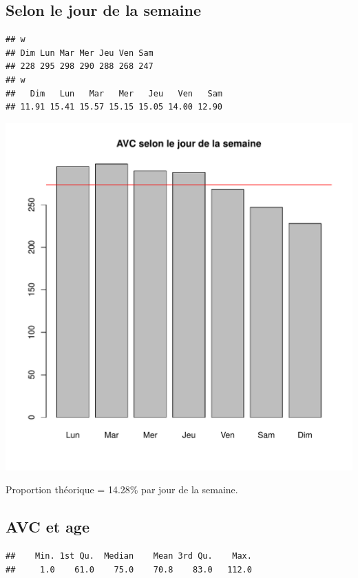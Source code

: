 \documentclass[12pt,english,french,twoside]{report}\usepackage[]{graphicx}\usepackage[]{color}
\makeatletter
\def\maxwidth{ %
  \ifdim\Gin@nat@width>\linewidth
    \linewidth
  \else
    \Gin@nat@width
  \fi
}
\newenvironment{kframe}{%
 \def\at@end@of@kframe{}%
 \ifinner\ifhmode%
  \def\at@end@of@kframe{\end{minipage}}%
  \begin{minipage}{\columnwidth}%
 \fi\fi%
 \def\FrameCommand##1{\hskip\@totalleftmargin \hskip-\fboxsep
 \colorbox{shadecolor}{##1}\hskip-\fboxsep
     \hskip-\linewidth \hskip-\@totalleftmargin \hskip\columnwidth}%
 \MakeFramed {\advance\hsize-\width
   \@totalleftmargin\z@ \linewidth\hsize
   \@setminipage}}%
 {\par\unskip\endMakeFramed%
 \at@end@of@kframe}
\newenvironment{knitrout}{}{} %
\makeatother
\begin{document}
\subsection*{Selon le jour de la semaine}

\begin{knitrout}
\color{fgcolor}\begin{kframe}
\begin{verbatim}
## w
## Dim Lun Mar Mer Jeu Ven Sam 
## 228 295 298 290 288 268 247
## w
##   Dim   Lun   Mar   Mer   Jeu   Ven   Sam 
## 11.91 15.41 15.57 15.15 15.05 14.00 12.90
\end{verbatim}
\end{kframe}
\includegraphics[width=\maxwidth]{figure/avc_jour_semaine} 

\end{knitrout}

Proportion théorique = 14.28\% par jour de la semaine.

\subsection*{AVC et age}
\begin{knitrout}
\color{fgcolor}\begin{kframe}
\begin{verbatim}
##    Min. 1st Qu.  Median    Mean 3rd Qu.    Max. 
##     1.0    61.0    75.0    70.8    83.0   112.0
\end{verbatim}
\end{kframe}
\end{knitrout}
\end{document}
